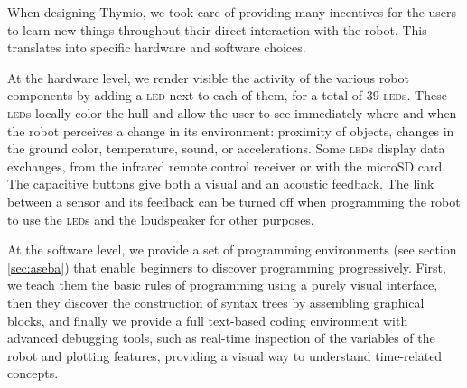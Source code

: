 \documentclass[letterpaper, 10 pt, conference]{ieeeconf}  %
\begin{document}
When designing Thymio, we took care of providing many incentives for the users to learn new things throughout their direct interaction with the robot.
This translates into specific hardware and software choices.

At the hardware level, we render visible the activity of the various robot components by adding a \textsc{led} next to each of them, for a total of 39 \textsc{led}s.
These \textsc{led}s locally color the hull and allow the user to see immediately where and when the robot perceives a change in its environment: proximity of objects, changes in the ground color, temperature, sound, or accelerations.
Some \textsc{led}s display data exchanges, from the infrared remote control receiver or with the microSD card. 
The capacitive buttons give both a visual and an acoustic feedback.
The link between a sensor and its feedback can be turned off when programming the robot to use the \textsc{led}s and the loudspeaker for other purposes.

At the software level, we provide a set of programming environments (see section \ref{sec:aseba}) that enable beginners to discover programming progressively.
First, we teach them the basic rules of programming using a purely visual interface, then they discover the construction of syntax trees by assembling graphical blocks, and finally we provide a full text-based coding environment with advanced debugging tools, such as real-time inspection of the variables of the robot and plotting features, providing a visual way to understand time-related concepts.
\end{document}
